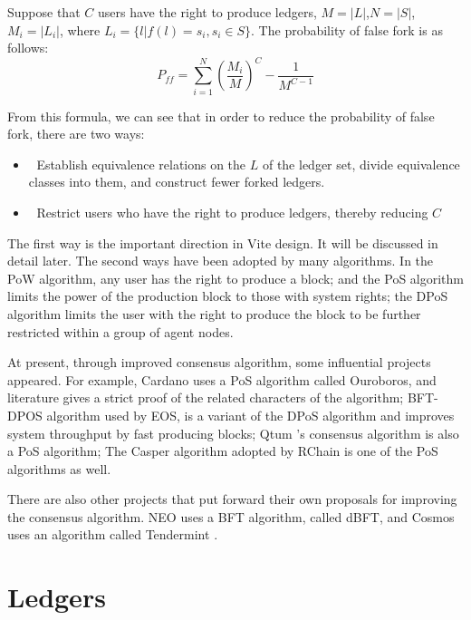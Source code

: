 \documentclass[UTF8,nofonts]{article}
\begin{document}
\begin{multicols}{2}
Suppose that $C$ users have the right to produce ledgers, $M = \vert L \vert$,$N = \vert S \vert$,$M_{i} = \vert L_{i} \vert$, where $L_{i} = \lbrace l \vert f(l) = s_{i}, s_{i} \in S \rbrace$.
The probability of false fork is as follows:
\begin{equation}
P_{ff} = \sum_{i=1}^{N}\left ( \frac{M_{i}}{M} \right )^{C} - \frac{1}{M^{C-1}}
\end{equation}

From this formula, we can see that in order to reduce the probability of false fork, there are two ways:
\begin{itemize}
	\item 	Establish equivalence relations on the $L$ of the ledger set, divide equivalence classes into them, and construct fewer forked ledgers.
	\item 	Restrict users who have the right to produce ledgers, thereby reducing $C$
\end{itemize}

The first way is the important direction in Vite design. It will be discussed in detail later. The second ways have been adopted by many algorithms. In the PoW algorithm, any user has the right to produce a block; and the PoS algorithm limits the power of the production block to those with system rights; the DPoS algorithm \cite{dpos}  limits the user with the right to produce the block to be further restricted within a group of agent nodes.
	
At present, through improved consensus algorithm, some influential projects appeared. For example, Cardano uses a PoS algorithm called Ouroboros, and literature \cite{bernardo2017ouroboros} gives a strict proof of the related characters of the algorithm; BFT-DPOS algorithm used by EOS\cite{eos}, is a variant of the DPoS algorithm and improves system throughput by fast producing blocks; Qtum \cite{dai2017smart}'s consensus algorithm is also a PoS algorithm; The Casper algorithm adopted by RChain \cite{rchain} is one of the PoS algorithms as well.

There are also other projects that put forward their own proposals for improving the consensus algorithm. NEO\cite{neo} uses a BFT algorithm, called dBFT, and Cosmos\cite{cosmos} uses an algorithm called Tendermint  \cite{tendermint}.

\section{Ledgers}

\end{multicols}
\end{document}
